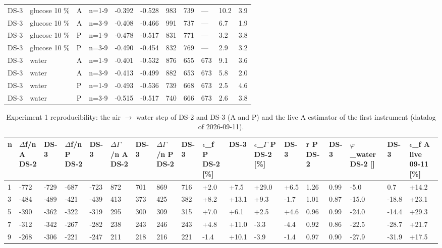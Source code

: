 \documentclass[11pt,a4paper]{article}
\begin{document}
\begin{landscape}
{\begin{longtable}{@{}lllllllllll@{}}
$$DS-3 & glucose 10 \% & A & n=1-9 & -0.392 & -0.528 & 983 & 739 & --- & 10.2 & 3.9 \\
DS-3 & glucose 10 \% & A & n=3-9 & -0.408 & -0.466 & 991 & 737 & --- & 6.7 & 1.9 \\
DS-3 & glucose 10 \% & P & n=1-9 & -0.478 & -0.517 & 831 & 771 & --- & 3.2 & 3.8 \\
DS-3 & glucose 10 \% & P & n=3-9 & -0.490 & -0.454 & 832 & 769 & --- & 2.9 & 3.2 \\
DS-3 & water & A & n=1-9 & -0.401 & -0.532 & 876 & 655 & 673 & 9.1 & 3.6 \\
DS-3 & water & A & n=3-9 & -0.413 & -0.499 & 882 & 653 & 673 & 5.8 & 2.0 \\
DS-3 & water & P & n=1-9 & -0.493 & -0.536 & 739 & 668 & 673 & 2.5 & 4.6 \\
DS-3 & water & P & n=3-9 & -0.515 & -0.517 & 740 & 666 & 673 & 2.6 & 3.8 \\
\bottomrule
\end{longtable}}\end{landscape}

\begin{landscape}{\scriptsize\setlength{\tabcolsep}{2pt}
\begin{longtable}{@{}llllllllllllllllll@{}}
\caption{Experiment 1 reproducibility: the air $\rightarrow$ water step of DS-2 and DS-3 (A and P) and the live A estimator of the first instrument (datalog of 2026-09-11).}\\
\toprule
n & $\Delta$f/n A DS-2 & DS-3 & $\Delta$f/n P DS-2 & DS-3 & $\Delta$$\Gamma$/n A DS-2 & DS-3 & $\Delta$$\Gamma$/n P DS-2 & DS-3 & $\epsilon$\_f P DS-2 [\%] & DS-3 & $\epsilon$\_$\Gamma$ P DS-2 [\%] & DS-3 & r P DS-2 & DS-3 & $\varphi$\_water DS-2 [\textdegree{}] & DS-3 & $\epsilon$\_f A live 09-11 [\%] \\\midrule\endhead
1 & -772 & -729 & -687 & -723 & 872 & 701 & 869 & 716 & +2.0 & +7.5 & +29.0 & +6.5 & 1.26 & 0.99 & -5.0 & 0.7 & +14.2 \\
3 & -484 & -489 & -421 & -439 & 413 & 373 & 425 & 382 & +8.2 & +13.1 & +9.3 & -1.7 & 1.01 & 0.87 & -15.0 & -18.8 & +23.1 \\
5 & -390 & -362 & -322 & -319 & 295 & 300 & 309 & 315 & +7.0 & +6.1 & +2.5 & +4.6 & 0.96 & 0.99 & -24.0 & -14.4 & +29.3 \\
7 & -312 & -342 & -267 & -282 & 238 & 243 & 246 & 243 & +4.8 & +11.0 & -3.3 & -4.4 & 0.92 & 0.86 & -22.5 & -28.7 & +21.7 \\
9 & -268 & -306 & -221 & -247 & 211 & 218 & 216 & 221 & -1.4 & +10.1 & -3.9 & -1.4 & 0.97 & 0.90 & -27.9 & -31.9 & +17.5 \\
\bottomrule
\end{longtable}}\end{landscape}
\end{document}
